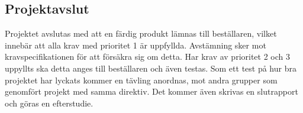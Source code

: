 \documentclass[11pt]{article}
\begin{document}
\begin{flushleft}
\section{Projektavslut}
Projektet avslutas med att en färdig produkt lämnas till beställaren, vilket innebär att alla krav med prioritet 1 är uppfyllda. Avstämning sker mot kravspecifikationen för att försäkra sig om detta. Har krav av prioritet 2 och 3 uppyllts ska detta anges till beställaren och även testas. Som ett test på hur bra projektet har lyckats kommer en tävling anordnas, mot andra grupper som genomfört projekt med samma direktiv. Det kommer även skrivas en slutrapport och göras en efterstudie. 

\end{flushleft}
\end{document}
